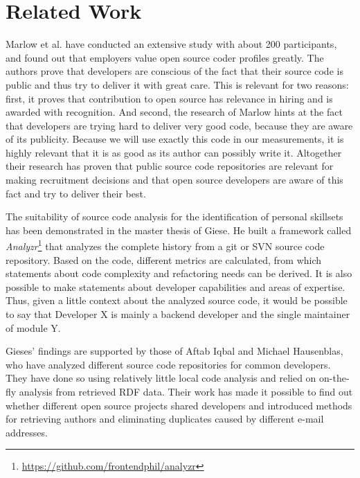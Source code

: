 \section{Related Work}
Marlow et al.\@\cite{md:2013} have conducted an extensive study with about 200 participants, and found out that employers value open source coder profiles greatly.
The authors prove that developers are conscious of the fact that their source code is public and thus try to deliver it with great care. This is relevant for two reasons: first, it proves that contribution to open source has relevance in hiring and is awarded with recognition. And second, the research of Marlow hints at the fact that developers are trying hard to deliver very good code, because they are aware of its publicity. Because we will use exactly this code in our measurements, it is highly relevant that it is as good as its author can possibly write it. Altogether their research has proven that public source code repositories are relevant for making recruitment decisions and that open source developers are aware of this fact and try to deliver their best.
\newline

The suitability of source code analysis for the identification of personal skillsets has been demonstrated in the master thesis of Giese\cite{pg:2014}. He built a framework called \textit{Analyzr}\footnote{\url{https://github.com/frontendphil/analyzr}} that analyzes the complete history from a git or SVN source code repository. Based on the code, different metrics are calculated, from which statements about code complexity and refactoring needs can be derived. It is also possible to make statements about developer capabilities and areas of expertise. Thus, given a little context about the analyzed source code, it would be possible to say that \glqq Developer X is mainly a backend developer and the single maintainer of module Y\grqq.

Gieses' findings are supported by those of Aftab Iqbal and Michael Hausenblas\cite{ih:2012}, who have analyzed different source code repositories for common developers. They have done so using relatively little local code analysis and relied on on-the-fly analysis from retrieved RDF data. Their work has made it possible to find out whether different open source projects shared developers and introduced methods for retrieving authors and eliminating duplicates caused by different e-mail addresses.
\newline

